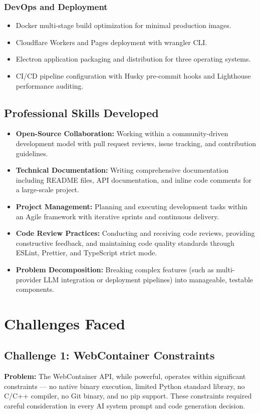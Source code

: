 \documentclass[12pt,a4paper,openany]{report}
\begin{document}
\subsubsection{DevOps and Deployment}
\begin{itemize}
    \item Docker multi-stage build optimization for minimal production images.
    \item Cloudflare Workers and Pages deployment with wrangler CLI.
    \item Electron application packaging and distribution for three operating systems.
    \item CI/CD pipeline configuration with Husky pre-commit hooks and Lighthouse performance auditing.
\end{itemize}

\subsection{Professional Skills Developed}

\begin{itemize}
    \item \textbf{Open-Source Collaboration:} Working within a community-driven development model with pull request reviews, issue tracking, and contribution guidelines.
    \item \textbf{Technical Documentation:} Writing comprehensive documentation including README files, API documentation, and inline code comments for a large-scale project.
    \item \textbf{Project Management:} Planning and executing development tasks within an Agile framework with iterative sprints and continuous delivery.
    \item \textbf{Code Review Practices:} Conducting and receiving code reviews, providing constructive feedback, and maintaining code quality standards through ESLint, Prettier, and TypeScript strict mode.
    \item \textbf{Problem Decomposition:} Breaking complex features (such as multi-provider LLM integration or deployment pipelines) into manageable, testable components.
\end{itemize}

\section{Challenges Faced}

\subsection{Challenge 1: WebContainer Constraints}
\textbf{Problem:} The WebContainer API, while powerful, operates within significant constraints --- no native binary execution, limited Python standard library, no C/C++ compiler, no Git binary, and no pip support. These constraints required careful consideration in every AI system prompt and code generation decision.
\end{document}
